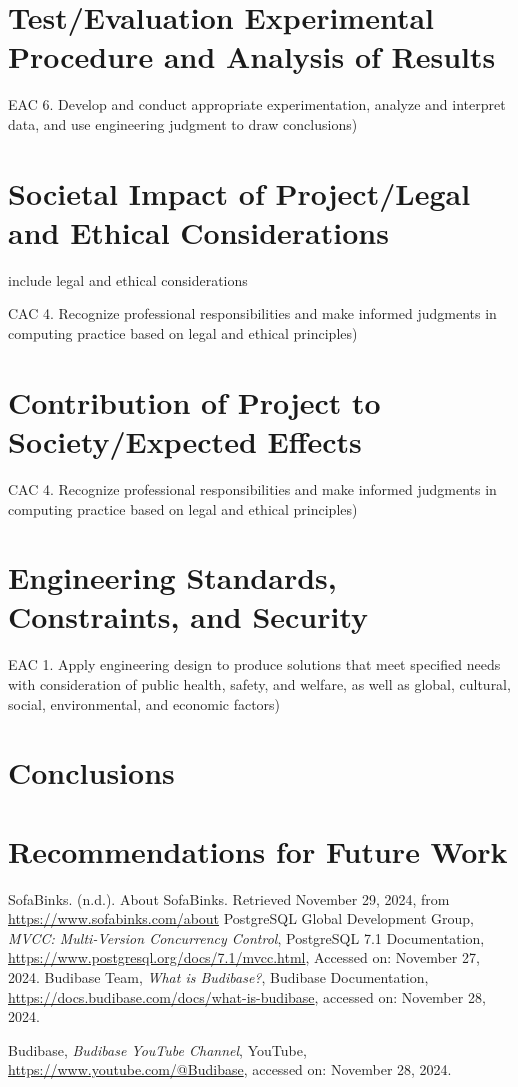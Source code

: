 \documentclass{article}
\begin{document}
\section{Test/Evaluation Experimental Procedure and Analysis of Results} 
EAC 6. Develop and conduct appropriate experimentation, analyze and interpret 
data, and use engineering judgment to draw conclusions) 

\section{Societal Impact of Project\slash Legal and Ethical Considerations} 
include legal and ethical considerations 

CAC 4. Recognize professional responsibilities and make informed judgments in 
computing practice based on legal and ethical principles) 

\section{Contribution of Project to Society\slash Expected Effects}
CAC 4. Recognize professional responsibilities and make informed judgments in 
computing practice based on legal and ethical principles) 

\section{Engineering Standards, Constraints, and Security}
EAC 1. Apply engineering design to produce solutions that meet specified needs with consideration of public health, 
safety, and welfare, as well as global, cultural, social, environmental, and economic 
factors) 
\section{Conclusions}

\section{Recommendations for Future Work}

\begin{thebibliography}{99}
 SofaBinks. (n.d.). 
    About SofaBinks. Retrieved November 29, 2024, from \url{https://www.sofabinks.com/about}
 PostgreSQL Global Development Group, \textit{MVCC: Multi-Version Concurrency Control}, 
    PostgreSQL 7.1 Documentation, \url{https://www.postgresql.org/docs/7.1/mvcc.html}, Accessed on: November 27, 2024.
Budibase Team, 
\textit{What is Budibase?}, Budibase Documentation, 
\url{https://docs.budibase.com/docs/what-is-budibase}, 
accessed on: November 28, 2024.

Budibase, 
\textit{Budibase YouTube Channel}, YouTube, 
\url{https://www.youtube.com/@Budibase}, 
accessed on: November 28, 2024.
\end{thebibliography}
\end{document}

